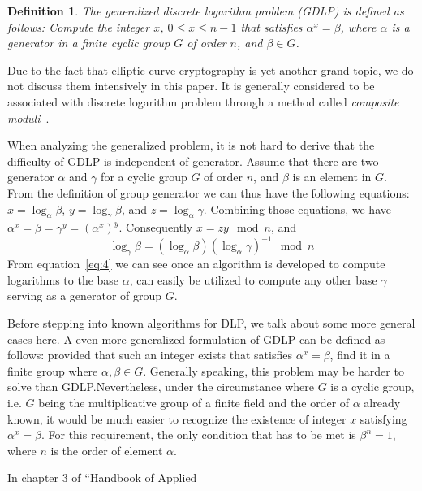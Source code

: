 \documentclass[12pt,journal,compsoc]{IEEEtran}
\newtheorem{definition}{Definition}
\begin{document}
\begin{definition}
The \emph{generalized discrete logarithm problem}
(GDLP) is defined as follows: Compute the integer $x$, $0\leq x\leq
n-1$ that satisfies $\alpha^{x}=\beta$, where $\alpha$ is a generator
in a finite cyclic group $G$ of order $n$, and $\beta\in G$.\label{def:Generalized-DLP}
\end{definition}
Due to the fact that elliptic curve cryptography is yet another grand
topic, we do not discuss them intensively in this paper. It is
generally considered to be associated with discrete logarithm problem
through a method called \emph{composite
  moduli}~\cite{ref:menezes2010handbook}. 
\par
When analyzing the generalized problem, it is not hard to derive that
the difficulty of GDLP is independent of generator. Assume that there
are two generator $\alpha$ and $\gamma$ for a cyclic group $G$ of
order $n$, and $\beta$ is an element in $G$. From the definition of
group generator we can thus have the following equations:
$x=\log_{\alpha}\beta$, $y=\log_{\gamma}\beta$, and
$z=\log_{\alpha}\gamma$. Combining those equations, we have
$\alpha^{x}=\beta=\gamma^{y}={(\alpha^{x})}^{y}$. Consequently
$x=zy\mod n$, and
\begin{equation}
  \label{eq:4}
  \log_{\gamma}\beta=(\log_{\alpha}\beta){(\log_{\alpha}\gamma)}^{-1}\mod
  n 
\end{equation}
From equation~\eqref{eq:4} we can see once an algorithm is developed to compute
logarithms to the base $\alpha$, can easily be utilized to compute any
other base $\gamma$ serving as a generator of group $G$.
\par
Before stepping into known algorithms for DLP, we talk about some more
general cases here. A even more generalized formulation of GDLP can be
defined as follows: provided that such an integer exists that
satisfies $\alpha^{x}=\beta$, find it in a finite group where
$\alpha,\beta\in G$. Generally speaking, this problem may be harder to
solve than GDLP.\@ Nevertheless, under the circumstance where $G$ is a
cyclic group, i.e. $G$ being the multiplicative group of a finite
field and the order of $\alpha$ already known, it would be much easier
to recognize the existence of integer $x$ satisfying
$\alpha^{x}=\beta$. For this requirement, the only condition that has
to be met is $\beta^{n}=1$, where $n$ is the order of element
$\alpha$.
\par
In chapter 3 of ``Handbook of Applied
\end{document}
